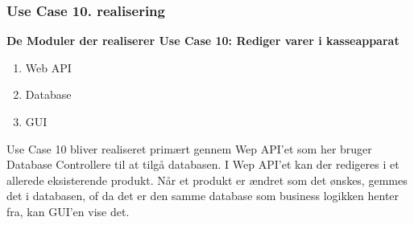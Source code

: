 \subsubsection{Use Case 10. realisering}
\textbf{De Moduler der realiserer Use Case 10: Rediger varer i kasseapparat}

\begin{enumerate}
	\item Web API
	\item Database
	\item GUI
\end{enumerate}

Use Case 10 bliver realiseret primært gennem Wep API'et som her bruger Database Controllere til at tilgå databasen. I Wep API'et kan der redigeres i et allerede eksisterende produkt. Når et produkt er ændret som det ønskes, gemmes det i databasen, of da det er den samme database som business logikken henter fra, kan GUI'en vise det.